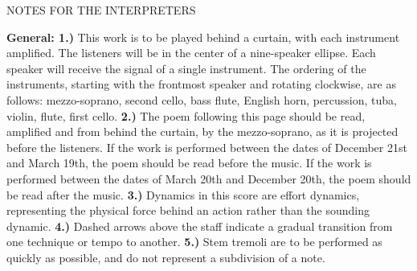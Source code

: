 \documentclass[11pt]{article}
\begin{document}
\vspace*{4\baselineskip}

\begingroup
\begin{center}
\huge NOTES FOR THE INTERPRETERS
\end{center}
\endgroup

\begingroup
\textbf{General: 1.)} This work is to be played behind a curtain, with each instrument amplified. The listeners will be in the center of a nine-speaker ellipse. Each speaker will receive the signal of a single instrument. The ordering of the instruments, starting with the frontmost speaker and rotating clockwise, are as follows: mezzo-soprano, second cello, bass flute, English horn, percussion, tuba, violin, flute, first cello. \textbf{2.)} The poem following this page should be read, amplified and from behind the curtain, by the mezzo-soprano, as it is projected before the listeners. If the work is performed between the dates of December 21st and March 19th, the poem should be read before the music. If the work is performed between the dates of March 20th and December 20th, the poem should be read after the music. \textbf{3.)}  Dynamics in this score are effort dynamics, representing the physical force behind an action rather than the sounding dynamic. \textbf{4.)} Dashed arrows above the staff indicate a gradual transition from one technique or tempo to another. \textbf{5.)}  Stem tremoli are to be performed as quickly as possible, and do not represent a subdivision of a note.
\endgroup
\end{document}
